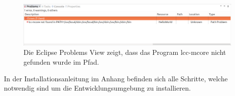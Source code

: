 \begin{figure}[H]
	\centering
		\includegraphics[scale=0.25]{compiler/patherror.png}
		\caption{Die Eclipse Problems View zeigt, dass das Program lcc-mcore nicht gefunden wurde im Pfad.}
		\label{fig:patherror}
\end{figure}

In der Installationsanleitung im Anhang befinden sich alle Schritte, welche notwendig sind um die Entwicklungsumgebung zu installieren.

